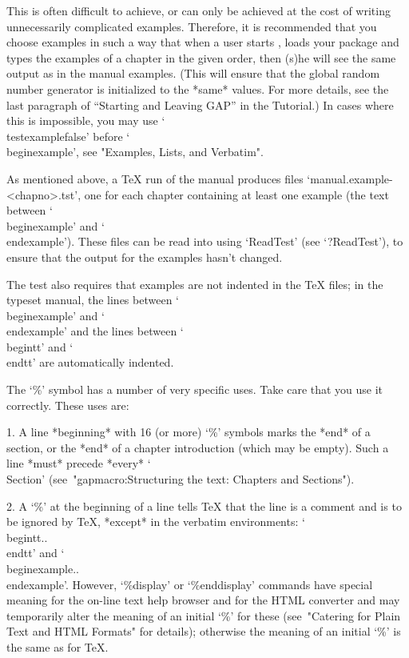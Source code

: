 This is often difficult to achieve, or can only be achieved at the cost of
writing unnecessarily complicated examples. Therefore, it is recommended that
you choose examples in such a way that when a user starts {\GAP}, loads your
package and types the examples of a chapter in the given order, then (s)he will
see the same output as in the manual examples. (This will ensure that the
global random number generator is initialized to the *same* values.
For more details,
see the last paragraph of ``Starting and Leaving GAP''
in the {\GAP} Tutorial.)
In cases where this is
impossible, you may use `\\testexamplefalse' before `\\beginexample', see
"Examples, Lists, and Verbatim".

As mentioned above, a {\TeX} run of the manual produces files
`manual.example-<chapno>.tst', one for each chapter containing at least
one {\GAP} example (the text between `\\beginexample'
and `\\endexample'). These files can be read into {\GAP} using `ReadTest'
(see `?ReadTest'), to ensure that the {\GAP} output for the examples
hasn't changed.

The test also requires that examples are not indented
in the {\TeX} files; in the typeset manual,
the lines between `\\beginexample' and `\\endexample'
and the lines between `\\begintt' and `\\endtt' are automatically
indented.



\indextt{\%}
The `\%' symbol has a number of very specific uses. Take  care  that  you
use it correctly. These uses are:
\beginlist%
\item{1.}
A line *beginning* with 16 (or more) `\%' symbols marks the  *end*  of  a
section, or the *end* of a chapter introduction  (which  may  be  empty).
Such  a  line  *must* precede  *every*  `\\Section'
(see~"gapmacro:Structuring the text: Chapters and Sections").

\item{2.}
A `\%' at the beginning of a line tells {\TeX} that the line is a comment
and is to be ignored by {\TeX}, *except* in  the  verbatim  environments:
`\\begintt..\\endtt'   and    `\\beginexample..\\endexample'.    However,
`\%display' or `\%enddisplay'  commands  have  special  meaning  for  the
on-line text help browser and for the HTML converter and may  temporarily
alter the meaning of an initial `\%' for these (see~"Catering  for  Plain
Text and HTML Formats" for details); otherwise the meaning of an  initial
`\%' is the same as for {\TeX}.


